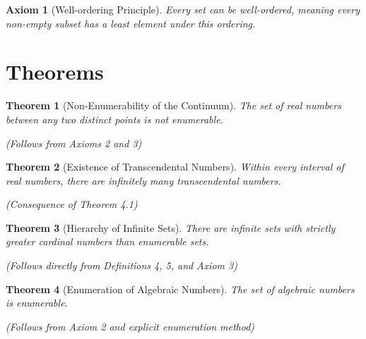 \documentclass[11pt]{article}
\newtheorem{axiom}{Axiom}[section]
\newtheorem{theorem}{Theorem}[section]
\begin{document}
\begin{axiom}[Well-ordering Principle]
Every set can be well-ordered, meaning every non-empty subset has a least element under this ordering.
\end{axiom}

\section{Theorems}

\begin{theorem}[Non-Enumerability of the Continuum]
The set of real numbers between any two distinct points is not enumerable.

\textit{(Follows from Axioms 2 and 3)}
\end{theorem}

\begin{theorem}[Existence of Transcendental Numbers]
Within every interval of real numbers, there are infinitely many transcendental numbers.

\textit{(Consequence of Theorem 4.1)}
\end{theorem}

\begin{theorem}[Hierarchy of Infinite Sets]
There are infinite sets with strictly greater cardinal numbers than enumerable sets.

\textit{(Follows directly from Definitions 4, 5, and Axiom 3)}
\end{theorem}

\begin{theorem}[Enumeration of Algebraic Numbers]
The set of algebraic numbers is enumerable.

\textit{(Follows from Axiom 2 and explicit enumeration method)}
\end{theorem}
\end{document}
